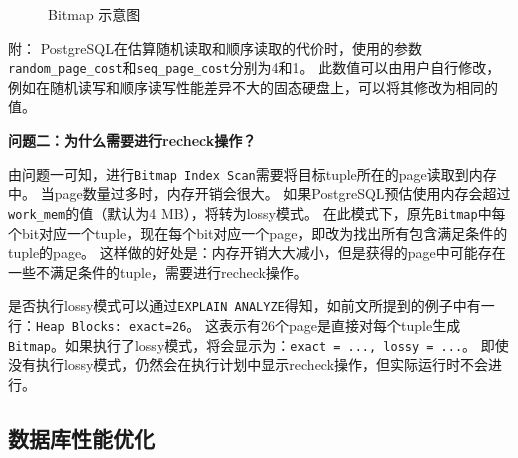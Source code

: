 \documentclass[a4paper,10pt]{ctexart}
\begin{document}
\begin{figure}[H]
    \centering
    \caption{Bitmap 示意图}
\end{figure}


附：
PostgreSQL在估算随机读取和顺序读取的代价时，使用的参数\texttt{random\_page\_cost}和\texttt{seq\_page\_cost}分别为4和1。
此数值可以由用户自行修改，例如在随机读写和顺序读写性能差异不大的固态硬盘上，可以将其修改为相同的值。

\vspace{0.7cm}
\textbf{问题二：为什么需要进行recheck操作？}

由问题一可知，进行\texttt{Bitmap Index Scan}需要将目标tuple所在的page读取到内存中。
当page数量过多时，内存开销会很大。
如果PostgreSQL预估使用内存会超过\texttt{work\_mem}的值（默认为4 MB），将转为lossy模式。
在此模式下，原先\texttt{Bitmap}中每个bit对应一个tuple，现在每个bit对应一个page，即改为找出所有包含满足条件的tuple的page。
这样做的好处是：内存开销大大减小，但是获得的page中可能存在一些不满足条件的tuple，需要进行recheck操作。

是否执行lossy模式可以通过\texttt{EXPLAIN ANALYZE}得知，如前文所提到的例子中有一行：\texttt{Heap Blocks: exact=26}。
这表示有26个page是直接对每个tuple生成\texttt{Bitmap}。如果执行了lossy模式，将会显示为：\texttt{exact = ..., lossy = ...}。
即使没有执行lossy模式，仍然会在执行计划中显示recheck操作，但实际运行时不会进行。

\subsection{数据库性能优化}
\end{document}

